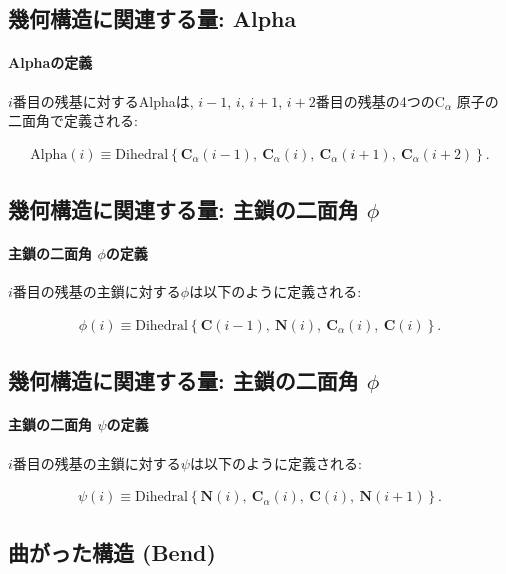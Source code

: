 \subsection{幾何構造に関連する量: Alpha}
\paragraph{Alphaの定義}
$i$番目の残基に対するAlphaは, $i-1$, $i$, $i+1$, $i+2$番目の残基の4つの$\mathrm{C}_{\alpha}$
原子の二面角で定義される:

\begin{align}
 \mathrm{Alpha}(i)
 \equiv
 \mathrm{Dihedral}
 \left\{
         \mathbf{C}_{\alpha}(i-1),~ \mathbf{C}_{\alpha}(i),~
         \mathbf{C}_{\alpha}(i+1),~ \mathbf{C}_{\alpha}(i+2)  
 \right\}.
\end{align}

\subsection{幾何構造に関連する量: 主鎖の二面角 $\phi$}
\paragraph{主鎖の二面角 $\phi$の定義}
$i$番目の残基の主鎖に対する$\phi$は以下のように定義される:

\begin{align}
 \phi (i)
 \equiv
 \mathrm{Dihedral}
 \left\{
         \mathbf{C}(i-1),~        \mathbf{N}(i),~
         \mathbf{C}_{\alpha}(i),~ \mathbf{C}(i)  
 \right\}.
\end{align}

\subsection{幾何構造に関連する量: 主鎖の二面角 $\phi$}
\paragraph{主鎖の二面角 $\psi$の定義}
$i$番目の残基の主鎖に対する$\psi$は以下のように定義される:

\begin{align}
 \psi (i)
 \equiv
 \mathrm{Dihedral}
 \left\{
         \mathbf{N}(i),~ \mathbf{C}_{\alpha}(i),~
         \mathbf{C}(i),~ \mathbf{N}(i+1)  
 \right\}.
\end{align}


\subsection{曲がった構造 (Bend)}
